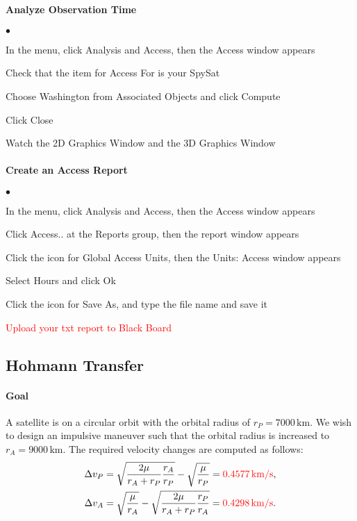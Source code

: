 \documentclass[10pt]{article}
\theoremstyle{plain}\theorembodyfont{\normalfont}
\renewcommand\emph[1]{\textsf{#1}}
\begin{document}
\paragraph{Analyze Observation Time}

\begin{list}{$\bullet$}
{\setlength{\itemsep}{-3pt}\setlength{\leftmargin}{30pt}}
\item In the menu, click \emph{Analysis} and \emph{Access}, then the \emph{Access} window appears
\item Check that the item for \emph{Access For} is your \emph{SpySat}
\item Choose \emph{Washington} from \emph{Associated Objects} and click \emph{Compute}
\item Click \emph{Close}
\item Watch the \emph{2D Graphics Window} and the \emph{3D Graphics Window}
\end{list}

\paragraph{Create an Access Report}

\begin{list}{$\bullet$}
{\setlength{\itemsep}{-3pt}\setlength{\leftmargin}{30pt}}
\item In the menu, click \emph{Analysis} and \emph{Access}, then the \emph{Access} window appears
\item Click \emph{Access..} at the \emph{Reports} group, then the report window appears
\item Click the icon for \emph{Global Access Units}, then the \emph{Units: Access} window appears
\item Select \emph{Hours} and click \emph{Ok}
\item Click the icon for \emph{Save As}, and type the file name and save it
\item \textcolor{red}{Upload your txt report to Black Board }

\end{list}

\subsection{Hohmann Transfer}

\paragraph{Goal} A satellite is on a circular orbit with the orbital radius of $r_P=7000\,\mathrm{km}$. We wish to design an impulsive maneuver such that the orbital radius is increased to $r_A=9000\,\mathrm{km}$. The required velocity changes are computed as follows:
\begin{align*}
\Delta v_P &= \sqrt{\frac{2\mu}{r_A+r_P}\frac{r_A}{r_P}} - \sqrt{\frac{\mu}{r_P}} = \text{\textcolor{red}{$0.4577\,\mathrm{km/s}$}},\\
\Delta v_A &= \sqrt{\frac{\mu}{r_A}}- \sqrt{\frac{2\mu}{r_A+r_P}\frac{r_P}{r_A}}  = \text{\textcolor{red}{$0.4298\,\mathrm{km/s}$}}.
\end{align*}
\end{document}

